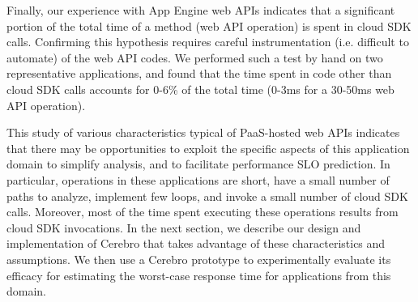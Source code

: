 Finally, our experience with App Engine web APIs indicates that a significant
portion of the total time of a method (web API operation) is spent in cloud SDK calls.
Confirming this hypothesis requires careful instrumentation (i.e. difficult
to automate) of the web API codes.  We performed such a test by hand on two 
representative applications, and found that the time spent in code other than cloud SDK calls
accounts for $0$-$6$\% of the total time (0-3ms for a 30-50ms web API operation).

This study of various characteristics typical of 
PaaS-hosted web APIs indicates that there may be 
opportunities to exploit the specific aspects of this
application domain to simplify analysis, and to facilitate
performance SLO prediction.  In particular, operations in these applications
are short, have a small number of paths to analyze, implement few
loops, and invoke a small number of cloud SDK calls. Moreover, most
of the time spent executing these operations results from cloud SDK invocations.
In the next section, we describe our design and implementation of Cerebro
that takes advantage of these characteristics and assumptions.
We then use a Cerebro prototype to experimentally evaluate its efficacy
for estimating the worst-case response time for 
applications from this domain.
